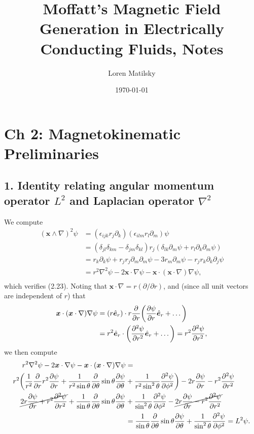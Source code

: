 \documentclass[12pt]{article} %
\date{\today}
\author{Loren Matilsky}
\title{Moffatt's Magnetic Field Generation in Electrically Conducting Fluids, Notes}
\newcommand{\pderiv}[2]{\frac{\partial#1}{\partial#2}}
\newcommand{\e}{\hat{\bm{e}}}
\begin{document}
\maketitle
\section*{Ch 2: Magnetokinematic Preliminaries}
\subsection*{1. Identity relating angular momentum operator $L^2$ and Laplacian operator $\nabla^2$}
We compute
\begin{align*}
(\bm{x}\wedge\nabla)^2\psi &= (\epsilon_{ijk}r_j\partial_k)(\epsilon_{ilm}r_l\partial_m)\psi\\
&= (\delta_{jl}\delta_{km} - \delta_{jm}\delta_{kl})r_j(\delta_{lk}\partial_m\psi + r_l\partial_k\partial_m\psi)\\
&= r_k\partial_k\psi + r_jr_j\partial_m\partial_m\psi - 3r_m\partial_m\psi - r_jr_k\partial_k\partial_j\psi\\
&= r^2\nabla^2\psi - 2\bm{x}\cdot\nabla\psi - \bm{x}\cdot(\bm{x}\cdot\nabla)\nabla\psi,\\
\end{align*}
which verifies (2.23). Noting that $\bm{x}\cdot\nabla = r(\partial/\partial r)$, and (since all unit vectors are independent of $r$) that
\begin{align*}
\bm{x}\cdot(\bm{x}\cdot\nabla)\nabla\psi &= (r\e_r)\cdot r\pderiv{}{r}\bigg{(}\pderiv{\psi}{r}\e_r + \dots\bigg{)}\\
&= r^2\e_r\cdot\bigg{(}\frac{\partial^2\psi}{\partial r^2}\e_r + \dots\bigg{)} = r^2\frac{\partial^2\psi}{\partial r^2},
\end{align*}
we then compute
\begin{align*}
r^2\nabla^2\psi - 2\bm{x}\cdot\nabla\psi - \bm{x}\cdot(\bm{x}\cdot\nabla)\nabla\psi &=\\
 r^2\bigg{(}\frac{1}{r^2}\pderiv{}{r}r^2\pderiv{\psi}{r} + \frac{1}{r^2\sin\theta}\pderiv{}{\theta}\sin\theta\pderiv{\psi}{\theta} &+ \frac{1}{r^2\sin^2\theta}\frac{\partial^2\psi}{\partial\phi^2}\bigg{)} - 2r\pderiv{\psi}{r} - r^2\frac{\partial^2\psi}{\partial r^2}\\
 \cancel{2r\pderiv{\psi}{r} + r^2\frac{\partial^2\psi}{\partial r^2}} + \frac{1}{\sin\theta}\pderiv{}{\theta}\sin\theta\pderiv{\psi}{\theta} &+
  \frac{1}{\sin^2\theta}\frac{\partial^2\psi}{\partial\phi^2} - \cancel{2r\pderiv{\psi}{r} - r^2\frac{\partial^2\psi}{\partial r^2}}\\
  &= \frac{1}{\sin\theta}\pderiv{}{\theta}\sin\theta\pderiv{\psi}{\theta} + \frac{1}{\sin^2\theta}\frac{\partial^2\psi}{\partial\phi^2} = L^2\psi.
\end{align*}
\end{document}
